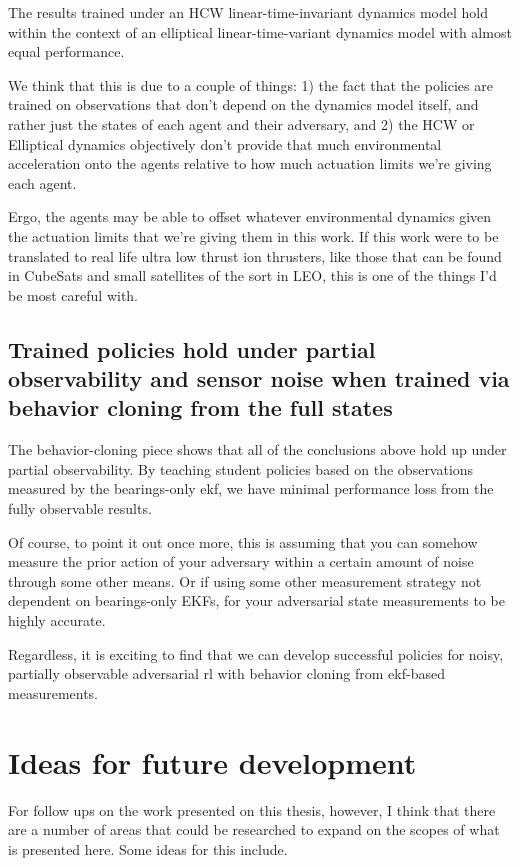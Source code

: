 The results trained under an HCW linear-time-invariant dynamics model hold within the context of an elliptical linear-time-variant dynamics model with almost equal performance. 

We think that this is due to a couple of things: 1) the fact that the policies are trained on observations that don't depend on the dynamics model itself, and rather just the states of each agent and their adversary, and 2) the HCW or Elliptical dynamics objectively don't provide that much environmental acceleration onto the agents relative to how much actuation limits we're giving each agent.

Ergo, the agents may be able to offset whatever environmental dynamics given the actuation limits that we're giving them in this work. If this work were to be translated to real life ultra low thrust ion thrusters, like those that can be found in CubeSats and small satellites of the sort in LEO, this is one of the things I'd be most careful with.


\subsection*{Trained policies hold under partial observability and sensor noise when trained via behavior cloning from the full states}

The behavior-cloning piece shows that all of the conclusions above hold up under partial observability. By teaching student policies based on the observations measured by the bearings-only \acs{ekf}, we have minimal performance loss from the fully observable results.

Of course, to point it out once more, this is assuming that you can somehow measure the prior action of your adversary within a certain amount of noise through some other means. Or if using some other measurement strategy not dependent on bearings-only EKFs, for your adversarial state measurements to be highly accurate.


Regardless, it is exciting to find that we can develop successful policies for noisy, partially observable adversarial \acs{rl} with behavior cloning from \acs{ekf}-based measurements.


\section{Ideas for future development}
\label{sec:future-development}

For follow ups on the work presented on this thesis, however, I think that there are a number of areas that could be  researched to expand on the scopes of what is presented here. Some ideas for this include.

